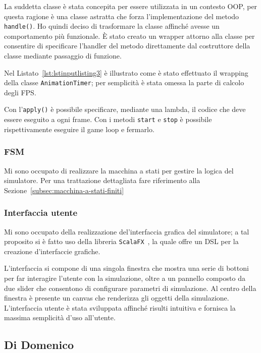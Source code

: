 La suddetta classe è stata concepita per essere utilizzata in un contesto OOP, per questa ragione è una classe astratta
che forza l'implementazione del metodo \texttt{handle()}.
Ho quindi deciso di trasformare la classe affinché avesse un comportamento più funzionale.
È stato creato un wrapper attorno alla classe per consentire di specificare l'handler del metodo direttamente
dal costruttore della classe mediante passaggio di funzione.

Nel Listato~\ref{lst:lstinputlisting3} è illustrato come è stato effettuato il wrapping della classe
\texttt{AnimationTimer}; per semplicità è stata omessa la parte di calcolo degli FPS\@.



Con l'\texttt{apply()} è possibile specificare, mediante una lambda, il codice che deve essere eseguito a ogni
frame.
Con i metodi \texttt{start} e \texttt{stop} è possibile rispettivamente eseguire il game loop e fermarlo.

\subsubsection{FSM}
Mi sono occupato di realizzare la macchina a stati per gestire la logica del simulatore.
Per una trattazione dettagliata fare riferimento alla Sezione~\ref{subsec:macchina-a-stati-finiti}

\subsubsection{Interfaccia utente}
Mi sono occupato della realizzazione del'interfaccia grafica del simulatore;
a tal proposito si è fatto uso della libreria \texttt{ScalaFX}~\cite{scalafx}, la quale offre un DSL per la creazione
d'interfaccie grafiche.

L'interfaccia si compone di una singola finestra che mostra una serie di bottoni per far interagire l'utente con la
simulazione, oltre a un pannello composto da due slider che consentono di configurare parametri di simulazione.
Al centro della finestra è presente un canvas che renderizza gli oggetti della simulazione.
L'interfaccia utente è stata sviluppata affinché risulti intuitiva e fornisca la massima semplicità d'uso all'utente.

\subsection{Di Domenico}\label{subsec:demo-di-domenico}

